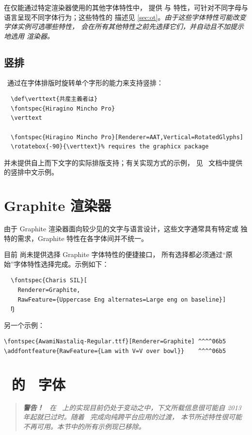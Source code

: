 \documentclass[a4paper]{l3doc}
\begin{document}
在仅能通过特定渲染器使用的其他字体特性中， 提供 
与  特性，可针对不同字母与语言呈现不同字体行为；这些特性的
描述见 \vref{sec:ot}。{\em 由于这些字体特性可能改变字体实例可选哪些特性，
 会在所有其他特性之前先选择它们，并自动且不加提示地选用
 渲染器。}


\subsection{竖排}

\XeTeX\ 通过在字体排版时旋转单个字形的能力来支持竖排：
\begin{Verbatim}
  \def\verttext{共産主義者は}
  \fontspec{Hiragino Mincho Pro}
  \verttext

  \fontspec{Hiragino Mincho Pro}[Renderer=AAT,Vertical=RotatedGlyphs]
  \rotatebox{-90}{\verttext}% requires the graphicx package
\end{Verbatim}

并未提供自上而下文字的实际排版支持；有关实现方式的示例，
见 \XeTeX\ 文档中提供的竖排中文示例。


\section{Graphite 渲染器}
\label{sec:graphite-features}

由于 Graphite 渲染器面向较少见的文字与语言设计，这些文字通常具有特定或
独特的需求，Graphite 特性在各字体间并不统一。

目前  尚未提供选择 Graphite 字体特性的便捷接口，
所有选择都必须通过“原始”字体特性选择完成。示例如下：
\begin{Verbatim}
  \fontspec{Charis SIL}[
    Renderer=Graphite,
    RawFeature={Uppercase Eng alternates=Large eng on baseline}]
  Ŋ
\end{Verbatim}

另一个示例：
\begin{Verbatim}
\fontspec{AwamiNastaliq-Regular.ttf}[Renderer=Graphite] ^^^^06b5
\addfontfeature{RawFeature={Lam with V=V over bowl}}    ^^^^06b5
\end{Verbatim}



\section{\MacOSX\ 的 \AAT\ 字体}
\label{sec:aat-features}

\begin{quote}\itshape
\textbf{警告！}
\XeTeX\ 在 \MacOSX\ 上的实现目前仍处于变动之中，下文所载信息很可能自
2013 年起就已过时。随着 \XeTeX\ 完成向纯跨平台应用的过渡，
本节所述特性很可能不再可用。本节中的所有示例现已移除。
\end{quote}
\end{document}
